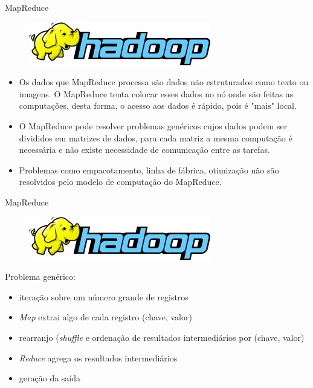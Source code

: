   \begin{frame}{MapReduce}

    \begin{figure}[hb]
      \centering
      \includegraphics[scale=2]{hadoop-logo.jpg}
    \end{figure}

     \begin{itemize}
       \item<1-> Os dados que MapReduce processa são dados não estruturados como texto ou imagens. O MapReduce tenta colocar esses dados no nó onde são feitas as computações, desta forma, o acesso aos dados é rápido, pois é "mais" local.
       \item<2-> O MapReduce pode resolver problemas genéricos cujos dados podem ser divididos em matrizes de dados, para cada matriz a mesma computação é necessária e não existe necessidade de comunicação entre as tarefas.
       \item<3-> Problemas como empacotamento, linha de fábrica, otimização não são resolvidos pelo modelo de computação do MapReduce.
     \end{itemize}

  \end{frame}

  \begin{frame}{MapReduce}

    \begin{figure}[hb]
      \centering
      \includegraphics[scale=2]{hadoop-logo.jpg}
    \end{figure}

Problema genérico:
\begin{itemize}
   \item iteração sobre um número grande de registros
   \item \emph{Map} extrai algo de cada registro (chave, valor)
   \item rearranjo (\emph{shuffle} e ordenação de resultados intermediários por (chave, valor)
   \item \emph{Reduce} agrega os resultados intermediários 
   \item geração da saída
\end{itemize}

  \end{frame}

